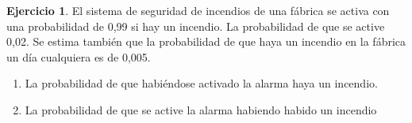 \documentclass[]{book}
\providecommand{\tightlist}{%
  \setlength{\itemsep}{0pt}\setlength{\parskip}{0pt}}
\theoremstyle{plain}
\theoremstyle{definition}
\newtheorem{exercise}[theorem]{Ejercicio}
\theoremstyle{definition} %
\begin{document}
  \begin{exercise}

  El sistema de seguridad de incendios de una fábrica se activa con una
  probabilidad de 0,99 si hay un incendio. La probabilidad de que se
  active 0,02. Se estima también que la
  probabilidad de que haya un incendio en la fábrica un día cualquiera
  es de 0,005.

  \begin{enumerate}
  \def\labelenumii{\arabic{enumii}.}
  \tightlist
  \item
    La probabilidad de que habiéndose activado la alarma haya un
    incendio.
  \item
    La probabilidad de que se active la alarma habiendo habido un
    incendio
  \end{enumerate}
\end{exercise}

  
\end{document}
